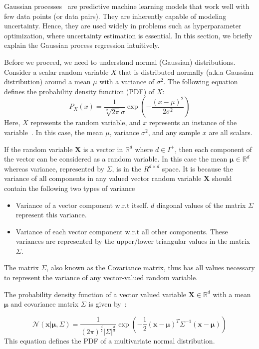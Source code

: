 \documentclass[11pt]{report}
\begin{document}
Gaussian processes~\cite{GPTutorial} are predictive machine learning models that work well with few data points (or data pairs). 
They are inherently capable of modeling uncertainty.
Hence, they are used widely in problems such as hyperparameter optimization, where uncertainty estimation is essential.
In this section, we briefly explain the Gaussian process regression intuitively.

Before we proceed,  we need to understand normal (Gaussian) distributions. 
Consider a scalar random variable $X$ that is distributed normally  (a.k.a Gaussian distribution) around a mean $\mu$ with a variance of $\sigma^2$.
The following equation defines the probability density function (PDF) of $X$: 
$$
P_X(x) = \frac{1}{\sqrt[2]{2\pi}\sigma}\exp\left(- \frac{(x - \mu)^2}{2\sigma^2}\right)
$$
Here, $X$ represents the random variable, and $x$ represents an instance of the variable~\cite{GPTutorial}.
In this case,  the mean $\mu$,  variance $\sigma^2$, and any sample $x$ are all scalars.

If the random variable $\textbf{X}$ is a vector in $\mathbb{R}^d$ where $d \in I^{+}$,  then each component of the vector can be considered as a random variable.
In this case the mean $\boldsymbol{\mu} \in \mathbb{R}^d$ whereas variance, represented by $\Sigma$, is in the $R^{d \times d}$ space.
It is because the variance of all components in any valued vector random variable $\textbf{X}$ should contain the following two types of variance
\begin{itemize}
\item Variance of a vector component w.r.t itself.
$d$ diagonal values of the matrix $\Sigma$ represent this variance.
\item Variance of each vector component w.r.t all other components. These variances are represented by the upper/lower triangular values in the matrix $\Sigma$.
\end{itemize}
The matrix $\Sigma$, also known as the Covariance matrix, thus has all values necessary to represent the variance of any vector-valued random variable.


The probability density function of a vector valued variable $\textbf{X} \in \mathbb{R}^d$ with a mean $\boldsymbol{\mu}$ and covariance matrix $\Sigma$ is given by~\cite{MITMLBook}:

$$
\mathcal{N}(\textbf{x} | \boldsymbol{\mu},  \Sigma) = 
\frac{1}{(2\pi)^{\frac{d}{2}} |\Sigma|^{\frac{d}{2}}}
\exp\left( - \frac{1}{2} (\textbf{x} - \boldsymbol{\mu})^T  \Sigma^{-1}   (\textbf{x} - \boldsymbol{\mu}) \right)
$$
This equation defines the PDF of a multivariate normal distribution.
\end{document}
